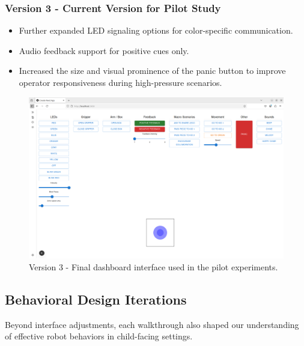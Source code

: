 \documentclass[a4paper]{usiinfbachelorproject}
\begin{document}
\subsubsection*{\textbf{Version 3 - Current Version for Pilot Study}}
\begin{itemize}
    \item Further expanded LED signaling options for color-specific communication.
    \item Audio feedback support for positive cues only.
    \item Increased the size and visual prominence of the panic button to improve operator responsiveness during high-pressure scenarios.
\end{itemize}
\begin{figure}[H]
    \centering
    \includegraphics[width=0.8\linewidth]{figures/dashboard_v3.png}
    \caption{Version 3 - Final dashboard interface used in the pilot experiments.}
    \label{fig:dashboard-v3}
\end{figure}

\subsection{\textbf{Behavioral Design Iterations}}

Beyond interface adjustments, each walkthrough also shaped our understanding of effective robot behaviors in child-facing settings.
\end{document}
